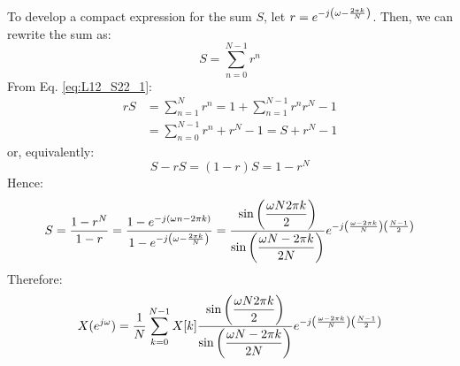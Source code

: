 \documentclass[../../main/main.tex]{subfiles}
\begin{document}
To develop a compact expression for the sum \( S \), let \( r = e^{-j\qty(\omega - \frac{2\pi k}{N})} \). Then, we can rewrite the sum as:
\begin{equation}
    S
    =
    \sum_{n=0}^{N-1} r^{n}
    \label{eq:L12_S22_1}
\end{equation}
From Eq. \ref{eq:L12_S22_1}:
\begin{align}
    rS
    &=
        \sum_{n=1}^{N} r^{n} = 1 + \sum_{n=1}^{N-1} r^{n} r^{N} - 1 \nonumber   \\
    &=
        \sum_{n=0}^{N-1} r^{n} + r^{N} - 1 = S + r^{N} - 1
\end{align}
or, equivalently:
\begin{equation}
    S - rS
    =
    (1-r)S
    =
    1 - r^{N}
    \label{eq:L12_S23_1}
\end{equation}
Hence:
\begin{equation}
    S
    =
    \frac{1-r^{N}}{1-r}
    =
    \frac{1-e^{-j\qty(\omega n - 2\pi k)}}{1-e^{-j\qty(\omega - \frac{2\pi k}{N})}}
    =
    \frac{\displaystyle\sin\qty(\frac{\omega N  2\pi k}{2})}{\displaystyle\sin\qty(\frac{\omega N - 2\pi k}{2N})} e^{-j \qty(\frac{\omega - 2\pi k}{N}) \qty(\frac{N-1}{2})}
\end{equation}
Therefore:
\begin{equation}
    X(e^{j\omega})
    =
    \frac{1}{N} \sum_{k=0}^{N-1} X[k]
    \frac{\displaystyle\sin\qty(\frac{\omega N  2\pi k}{2})}{\displaystyle\sin\qty(\frac{\omega N - 2\pi k}{2N})}
    e^{-j \qty(\frac{\omega - 2\pi k}{N}) \qty(\frac{N-1}{2})}
    \label{eq:L12_S24_1}
\end{equation}
\end{document}
